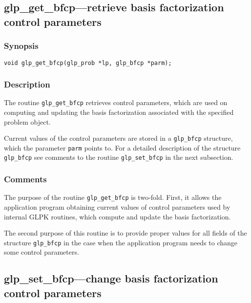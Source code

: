 
\newpage

\subsection{glp\_get\_bfcp---retrieve basis factorization control
parameters}

\subsubsection*{Synopsis}

\begin{verbatim}
void glp_get_bfcp(glp_prob *lp, glp_bfcp *parm);
\end{verbatim}

\subsubsection*{Description}

The routine \verb|glp_get_bfcp| retrieves control parameters, which are
used on computing and updating the basis factorization associated with
the specified problem object.

Current values of the control parameters are stored in a \verb|glp_bfcp|
structure, which the parameter \verb|parm| points to. For a detailed
description of the structure \verb|glp_bfcp| see comments to the routine
\verb|glp_set_bfcp| in the next subsection.

\subsubsection*{Comments}

The purpose of the routine \verb|glp_get_bfcp| is two-fold. First, it
allows the application program obtaining current values of control
parameters used by internal GLPK routines, which compute and update the
basis factorization.

The second purpose of this routine is to provide proper values for all
fields of the structure \verb|glp_bfcp| in the case when the application
program needs to change some control parameters.

\subsection{glp\_set\_bfcp---change basis factorization control
parameters}

